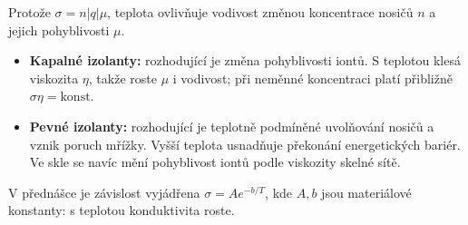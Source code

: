 Protože $\sigma=n|q|\mu$, teplota ovlivňuje vodivost změnou koncentrace nosičů $n$ a jejich pohyblivosti $\mu$.
\begin{itemize}
\item \textbf{Kapalné izolanty:} rozhodující je změna pohyblivosti iontů. S teplotou klesá viskozita $\eta$, takže roste $\mu$ i vodivost; při neměnné koncentraci platí přibližně $\sigma\eta=\mathrm{konst.}$
\item \textbf{Pevné izolanty:} rozhodující je teplotně podmíněné uvolňování nosičů a vznik poruch mřížky. Vyšší teplota usnadňuje překonání energetických bariér. Ve skle se navíc mění pohyblivost iontů podle viskozity skelné sítě.
\end{itemize}
V přednášce je závislost vyjádřena $\sigma=Ae^{-b/T}$, kde $A,b$ jsou materiálové konstanty: s teplotou konduktivita roste.
